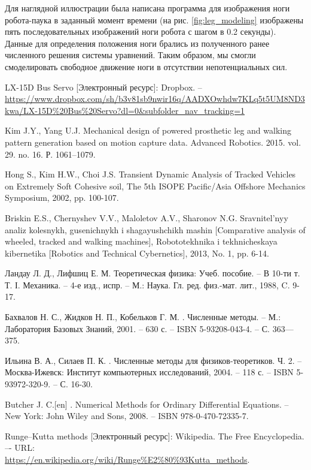 \documentclass{article}
\begin{document}
Для наглядной иллюстрации была написана программа для изображения ноги робота-паука в заданный момент времени (на рис. \ref{fig:leg_modeling} изображены пять последовательных изображений ноги робота с шагом в 0.2 секунды). Данные для определения положения ноги брались из полученного ранее численного решения системы уравнений. Таким образом, мы смогли смоделировать свободное движение ноги в отсутствии непотенциальных сил.

\newpage

\begin{thebibliography}{9}
LX-15D Bus Servo [Электронный ресурс]: Dropbox. --
\\
\url{https://www.dropbox.com/sh/b3v81sb9nwir16q/AADXOwhdw7KLq5t5UM8ND3kwa/LX-15D%20Bus%20Servo?dl=0&subfolder_nav_tracking=1}

Kim J.Y., Yang U.J. Mechanical design of powered prosthetic leg and walking pattern generation based on motion capture data. Advanced Robotics. 2015. vol. 29. no. 16. Р. 1061–1079.

Hong S., Kim H.W., Choi J.S. Transient Dynamic Analysis of Tracked Vehicles on Extremely Soft Cohesive soil, The 5th ISOPE Pacific/Asia Offshore Mechanics Symposium, 2002, pp. 100-107.

Briskin E.S., Chernyshev V.V., Maloletov A.V., Sharonov N.G. Sravnitel'nyy analiz kolesnykh, gusenichnykh i shagayushchikh mashin [Comparative analysis of wheeled, tracked and walking machines], Robototekhnika i tekhnicheskaya kibernetika [Robotics and Technical Cybernetics], 2013, No. 1, pp. 6-14.

Ландау Л. Д., Лифшиц Е. М. Теоретическая физика: Учеб. пособие. -- В 10-ти т. Т. І. Механика. -- 4-е изд., испр. -- М.: Наука. Гл. ред. физ.-мат. лит., 1988, C. 9-17.

Бахвалов Н. С., Жидков Н. П., Кобельков Г. М. . Численные методы. -- М.: Лаборатория Базовых Знаний, 2001. -- 630 с. -- ISBN 5-93208-043-4. -- С. 363—375.

Ильина В. А., Силаев П. К. . Численные методы для физиков-теоретиков. Ч. 2. -- Москва-Ижевск: Институт компьютерных исследований, 2004. -- 118 с. -- ISBN 5-93972-320-9. -- С. 16-30.

Butcher J. C.[en] . Numerical Methods for Ordinary Differential Equations. -- New York: John Wiley and Sons, 2008. -- ISBN 978-0-470-72335-7.

Runge–Kutta methods [Электронный ресурс]: Wikipedia. The Free Encyclopedia. –- URL: \\
\url{https://en.wikipedia.org/wiki/Runge%E2%80%93Kutta_methods}.


\end{thebibliography}
\end{document}
